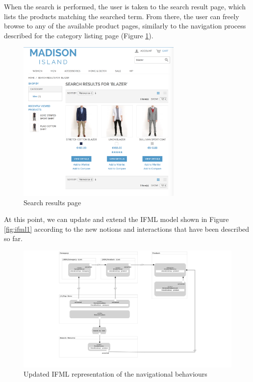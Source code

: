 When the search is performed, the user is taken to the search result page, which lists the products matching the searched term. From there, the user can freely browse to any of the available product pages, similarly to the navigation process described for the category listing page (Figure \ref{fig:search-results}).

\vspace{0.5cm}
\begin{figure}[H]
  \centering
    \includegraphics[height=8cm]{images/madison/search-results.png}
  \caption{Search results page}
  \label{fig:search-results}
\end{figure}
\vspace{0.5cm}

At this point, we can update and extend the IFML model shown in Figure \ref{fig:ifml1} according to the new notions and interactions that have been described so far.

\vspace{0.5cm}
\begin{figure}[H]
  \centering
    \includegraphics[width=14cm]{images/madison/ifml2.png}
  \caption{Updated IFML representation of the navigational behaviours}
  \label{fig:ifml2}
\end{figure}
\vspace{0.5cm}

